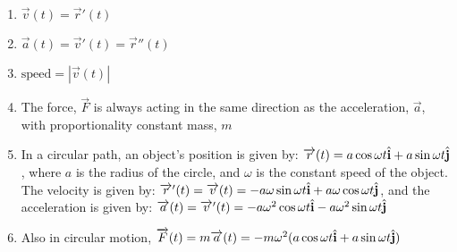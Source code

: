 \documentclass[12pt]{article}
\begin{document}
\begin{enumerate}
 
  \item $\overrightarrow{v}(t)=\overrightarrow{r}'(t)$

  \item $\overrightarrow{a}(t)=\overrightarrow{v}'(t)=\overrightarrow{r}''(t)$

  \item $\text{speed}=|\overrightarrow{v}(t)|$

  \item The force, $\overrightarrow{F}$ is always acting in the same direction as the acceleration, $\overrightarrow{a}$, with proportionality constant mass, $m$

  \item In a circular path, an object's position is given by: $\overrightarrow{r}(t) = a\cos \omega t \hat{\bold{i}} + a \sin \omega t \hat{\bold{j}}$, where $a$ is the radius of the circle, and $\omega$ is the constant speed of the object. The velocity is given by: $\overrightarrow{r}'(t)=\overrightarrow{v}(t)=-a\omega \sin \omega t \hat{\bold{i}} + a \omega \cos \omega t \hat{\bold{j}}$, and the acceleration is given by: $\overrightarrow{a}(t)=\overrightarrow{v}'(t)=-a\omega^2\cos \omega t \hat{\bold{i}} - a\omega^2 \sin \omega t \hat{\bold{j}}$

  \item Also in circular motion, $\overrightarrow{F}(t)=m\overrightarrow{a}(t)=-m\omega^2(a\cos \omega t \hat{\bold{i}} + a \sin \omega t \hat{\bold{j}})$

\end{enumerate}
\end{document}
